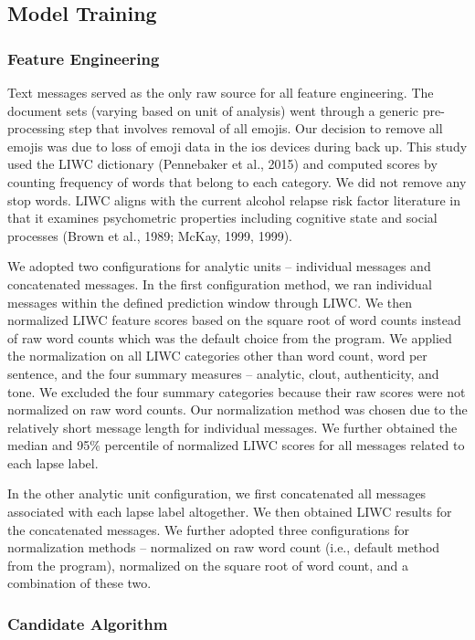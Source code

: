 \documentclass[
  letterpaper,
  DIV=11,
  numbers=noendperiod]{scrartcl}
\begin{document}
\subsection{Model Training}\label{model-training}

\subsubsection{Feature Engineering}\label{feature-engineering}

Text messages served as the only raw source for all feature engineering.
The document sets (varying based on unit of analysis) went through a
generic pre-processing step that involves removal of all emojis. Our
decision to remove all emojis was due to loss of emoji data in the ios
devices during back up. This study used the LIWC dictionary (Pennebaker
et al., 2015) and computed scores by counting frequency of words that
belong to each category. We did not remove any stop words. LIWC aligns
with the current alcohol relapse risk factor literature in that it
examines psychometric properties including cognitive state and social
processes (Brown et al., 1989; McKay, 1999, 1999).

We adopted two configurations for analytic units -- individual messages
and concatenated messages. In the first configuration method, we ran
individual messages within the defined prediction window through LIWC.
We then normalized LIWC feature scores based on the square root of word
counts instead of raw word counts which was the default choice from the
program. We applied the normalization on all LIWC categories other than
word count, word per sentence, and the four summary measures --
analytic, clout, authenticity, and tone. We excluded the four summary
categories because their raw scores were not normalized on raw word
counts. Our normalization method was chosen due to the relatively short
message length for individual messages. We further obtained the median
and 95\% percentile of normalized LIWC scores for all messages related
to each lapse label.

In the other analytic unit configuration, we first concatenated all
messages associated with each lapse label altogether. We then obtained
LIWC results for the concatenated messages. We further adopted three
configurations for normalization methods -- normalized on raw word count
(i.e., default method from the program), normalized on the square root
of word count, and a combination of these two.

\subsubsection{Candidate Algorithm}\label{candidate-algorithm}
\end{document}
